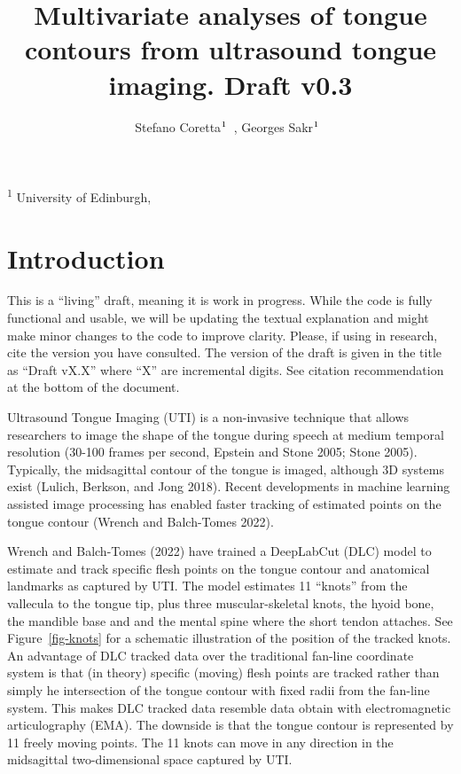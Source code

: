 \documentclass[
]{interact}
\title{Multivariate analyses of tongue contours from ultrasound tongue
imaging. Draft v0.3}
\author{Stefano
Coretta$\textsuperscript{1}$~\orcidlink{0000-0001-9627-5532}, Georges
Sakr$\textsuperscript{1}$~\orcidlink{0000-0003-3813-2669}}
\begin{document}
\captionsetup{labelsep=space}
\maketitle
\textsuperscript{1}  University of Edinburgh,  


\section{Introduction}\label{introduction}

\begin{tcolorbox}[enhanced jigsaw, titlerule=0mm, bottomrule=.15mm, left=2mm, colback=white, breakable, toptitle=1mm, colframe=quarto-callout-warning-color-frame, opacityback=0, colbacktitle=quarto-callout-warning-color!10!white, opacitybacktitle=0.6, title=\textcolor{quarto-callout-warning-color}{\faExclamationTriangle}\hspace{0.5em}{Warning}, leftrule=.75mm, bottomtitle=1mm, arc=.35mm, rightrule=.15mm, coltitle=black, toprule=.15mm]

This is a ``living'' draft, meaning it is work in progress. While the
code is fully functional and usable, we will be updating the textual
explanation and might make minor changes to the code to improve clarity.
Please, if using in research, cite the version you have consulted. The
version of the draft is given in the title as ``Draft vX.X'' where ``X''
are incremental digits. See citation recommendation at the bottom of the
document.

\end{tcolorbox}

Ultrasound Tongue Imaging (UTI) is a non-invasive technique that allows
researchers to image the shape of the tongue during speech at medium
temporal resolution (30-100 frames per second, Epstein and Stone 2005;
Stone 2005). Typically, the midsagittal contour of the tongue is imaged,
although 3D systems exist (Lulich, Berkson, and Jong 2018). Recent
developments in machine learning assisted image processing has enabled
faster tracking of estimated points on the tongue contour (Wrench and
Balch-Tomes 2022).

Wrench and Balch-Tomes (2022) have trained a DeepLabCut (DLC) model to
estimate and track specific flesh points on the tongue contour and
anatomical landmarks as captured by UTI. The model estimates 11
``knots'' from the vallecula to the tongue tip, plus three
muscular-skeletal knots, the hyoid bone, the mandible base and and the
mental spine where the short tendon attaches. See Figure~\ref{fig-knots}
for a schematic illustration of the position of the tracked knots. An
advantage of DLC tracked data over the traditional fan-line coordinate
system is that (in theory) specific (moving) flesh points are tracked
rather than simply he intersection of the tongue contour with fixed
radii from the fan-line system. This makes DLC tracked data resemble
data obtain with electromagnetic articulography (EMA). The downside is
that the tongue contour is represented by 11 freely moving points. The
11 knots can move in any direction in the midsagittal two-dimensional
space captured by UTI.
\end{document}

